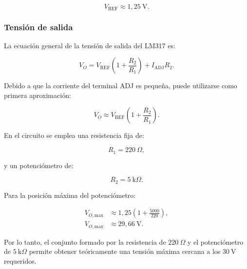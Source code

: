 \documentclass[12pt,a4paper]{article}
\begin{document}
	\begin{equation}
		V_{\mathrm{REF}}
		\approx
		1,25~\text{V}.
	\end{equation}
	
	\subsubsection{Tensión de salida}
	
	La ecuación general de la tensión de salida del LM317 es:
	
	\begin{equation}
		V_O
		=
		V_{\mathrm{REF}}
		\left(
		1+\frac{R_2}{R_1}
		\right)
		+
		I_{\mathrm{ADJ}}R_2.
	\end{equation}
	
	Debido a que la corriente del terminal ADJ es pequeña, puede utilizarse como
	primera aproximación:
	
	\begin{equation}
		V_O
		\approx
		V_{\mathrm{REF}}
		\left(
		1+\frac{R_2}{R_1}
		\right).
	\end{equation}
	
	En el circuito se emplea una resistencia fija de:
	
	\begin{equation}
		R_1
		=
		220~\Omega,
	\end{equation}
	
	y un potenciómetro de:
	
	\begin{equation}
		R_2
		=
		5~\text{k}\Omega.
	\end{equation}
	
	Para la posición máxima del potenciómetro:
	
	\begin{align}
		V_{O,\mathrm{max}}
		&\approx
		1,25
		\left(
		1+\frac{5000}{220}
		\right),
		\\
		V_{O,\mathrm{max}}
		&\approx
		29,66~\text{V}.
	\end{align}
	
	Por lo tanto, el conjunto formado por la resistencia de $220~\Omega$ y el
	potenciómetro de $5~\text{k}\Omega$ permite obtener teóricamente una tensión
	máxima cercana a los $30~\text{V}$ requeridos.
	
\end{document}

